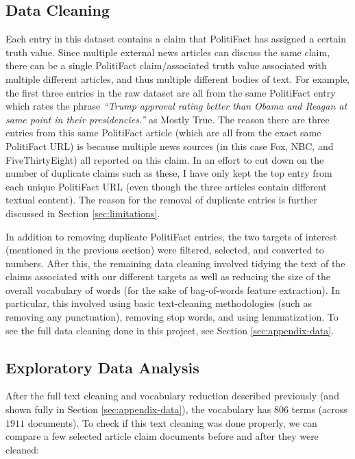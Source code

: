 \documentclass[12pt]{article}
\begin{document}
\hypertarget{data-cleaning}{%
\subsection{Data Cleaning}\label{data-cleaning}}

Each entry in this dataset contains a claim that PolitiFact has assigned
a certain truth value. Since multiple external news articles can discuss
the same claim, there can be a single PolitiFact claim/associated truth
value associated with multiple different articles, and thus multiple
different bodies of text. For example, the first three entries in the
raw dataset are all from the same PolitiFact entry which rates the
phrase \emph{``Trump approval rating better than Obama and Reagan at
same point in their presidencies.''} as Mostly True. The reason there
are three entries from this same PolitiFact article (which are all from
the exact same PolitiFact URL) is because multiple news sources (in this
case Fox, NBC, and FiveThirtyEight) all reported on this claim. In an
effort to cut down on the number of duplicate claims such as these, I
have only kept the top entry from each unique PolitiFact URL (even
though the three articles contain different textual content). The reason
for the removal of duplicate entries is further discussed in Section
\ref{sec:limitations}.

In addition to removing duplicate PolitiFact entries, the two targets of
interest (mentioned in the previous section) were filtered, selected,
and converted to numbers. After this, the remaining data cleaning
involved tidying the text of the claims associated with our different
targets as well as reducing the size of the overall vocabulary of words
(for the sake of bag-of-words feature extraction). In particular, this
involved using basic text-cleaning methodologies (such as removing any
punctuation), removing stop words, and using lemmatization. To see the
full data cleaning done in this project, see Section
\ref{sec:appendix-data}.

\hypertarget{exploratory-data-analysis}{%
\subsection{Exploratory Data Analysis}\label{exploratory-data-analysis}}

After the full text cleaning and vocabulary reduction described
previously (and shown fully in Section \ref{sec:appendix-data}), the
vocabulary has \(806\) terms (across \(1911\) documents). To check if
this text cleaning was done properly, we can compare a few selected
article claim documents before and after they were cleaned:
\end{document}
